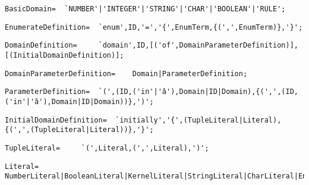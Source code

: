 \documentclass{article}
\begin{document}
    \begin{flushleft}
    \begin{lstlisting}[mathescape=true, breaklines=true]
      BasicDomain= 	`NUMBER'|'INTEGER'|'STRING'|'CHAR'|'BOOLEAN'|'RULE';
    \end{lstlisting}
    \end{flushleft}
    \begin{flushleft}
    \begin{lstlisting}[mathescape=true, breaklines=true]
      EnumerateDefinition= 	`enum',ID,'=','{',EnumTerm,{(',',EnumTerm)},'}';
    \end{lstlisting}
    \end{flushleft}
    \begin{flushleft}
    \begin{lstlisting}[mathescape=true, breaklines=true]
      DomainDefinition= 	`domain',ID,[('of',DomainParameterDefinition)],[(InitialDomainDefinition)];
    \end{lstlisting}
    \end{flushleft}
    \begin{flushleft}
    \begin{lstlisting}[mathescape=true, breaklines=true]
      DomainParameterDefinition= 	Domain|ParameterDefinition;
    \end{lstlisting}
    \end{flushleft}
    \begin{flushleft}
    \begin{lstlisting}[mathescape=true, breaklines=true]
      ParameterDefinition= 	`(',(ID,('in'|'â'),Domain|ID|Domain),{(',',(ID,('in'|'â'),Domain|ID|Domain))},')';
    \end{lstlisting}
    \end{flushleft}
    \begin{flushleft}
    \begin{lstlisting}[mathescape=true, breaklines=true]
      InitialDomainDefinition= 	`initially','{',(TupleLiteral|Literal),{(',',(TupleLiteral|Literal))},'}';
    \end{lstlisting}
    \end{flushleft}
    \begin{flushleft}
    \begin{lstlisting}[mathescape=true, breaklines=true]
      TupleLiteral= 	`(',Literal,(',',Literal),')';
    \end{lstlisting}
    \end{flushleft}
    \begin{flushleft}
    \begin{lstlisting}[mathescape=true, breaklines=true]
      Literal= 	NumberLiteral|BooleanLiteral|KernelLiteral|StringLiteral|CharLiteral|EnumTerm;
    \end{lstlisting}
    \end{flushleft}
\end{document}
